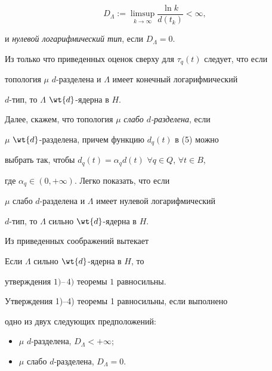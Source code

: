 $$


D_\Lambda:=\limsup\limits_{k\to\infty}\frac{\ln k}{d(t_k)}<\infty,


$$


и {\it нулевой логарифмический тип}, если $D_\Lambda=0$.





Из только что приведенных оценок сверху для $\tau_q(t)$ следует, что если


топология $\mu$\; $d$-разделена и $\Lambda$ имеет конечный логарифмический


$d$-тип, то $\Lambda$\; $\wt{d}$-ядерна в $H$.





Далее, скажем, что топология $\mu$ {\it слабо $d$-разделена}, если


$\mu$\; $\wt{d}$-разделена, причем функцию $d_q(t)$ в (5) можно


выбрать так, чтобы $d_q(t)=\alpha_qd(t)$ $\forall q\in Q$, $\forall t\in B$,


где $\alpha_q\in(0,+\infty)$. Легко показать, что если


$\mu$ слабо $d$-разделена и $\Lambda$ имеет нулевой логарифмический


$d$-тип, то $\Lambda$ сильно $\wt{d}$-ядерна в $H$.





Из приведенных соображений вытекает





\begin{thm}


Если $\Lambda$ сильно $\wt{d}$-ядерна в $H$, то


утверждения $1)$--\,$4)$ теоремы $1$ равносильны.


\end{thm}





\begin{cornonum}


Утверждения 1)--4) теоремы 1 равносильны, если выполнено


одно из двух следующих предположений:


\begin{itemize}


\item[(i)] $\mu$\; $d$-разделена, $D_\Lambda<+\infty$;


\item[(ii)] $\mu$ слабо $d$-разделена, $D_\Lambda=0$.


\end{itemize}


\end{cornonum}





